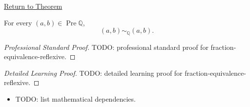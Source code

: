 \newpage
{}
\label{prf:fraction-equivalence-reflexive}

\begin{remark*}[Return]
\hyperref[lem:fraction-equivalence-reflexive]{Return to Theorem}
\end{remark*}

\begin{lemma*}
For every $(a,b)\in\operatorname{Pre}\mathbb{Q}$,
\[
(a,b)\sim_{\mathbb{Q}}(a,b).
\]
\end{lemma*}

\begin{proof}[Professional Standard Proof]
\LRAProofBodyStart
TODO: professional standard proof for fraction-equivalence-reflexive.
\end{proof}

\begin{proof}[Detailed Learning Proof]
\LRAProofBodyStart
TODO: detailed learning proof for fraction-equivalence-reflexive.
\end{proof}

\begin{remark*}
\end{remark*}

\begin{dependencies}
\begin{itemize}
  \item TODO: list mathematical dependencies.
\end{itemize}
\end{dependencies}

\clearpage
